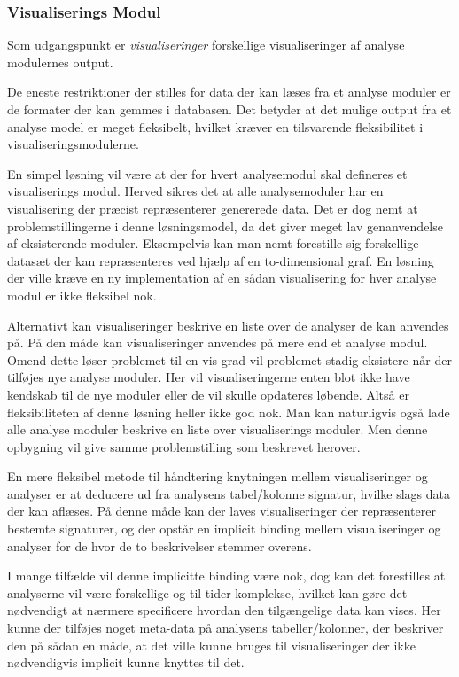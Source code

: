 \subsubsection{Visualiserings Modul}

Som udgangspunkt er \textit{visualiseringer} forskellige visualiseringer af analyse modulernes output.

De eneste restriktioner der stilles for data der kan læses fra et analyse moduler er de formater der kan gemmes i databasen.
Det betyder at det mulige output fra et analyse model er meget fleksibelt, hvilket kræver en tilsvarende fleksibilitet i visualiseringsmodulerne.

En simpel løsning vil være at der for hvert analysemodul skal defineres et visualiserings modul.
Herved sikres det at alle analysemoduler har en visualisering der præcist repræsenterer genererede data.
Det er dog nemt at problemstillingerne i denne løsningsmodel, da det giver meget lav genanvendelse af eksisterende moduler.
Eksempelvis kan man nemt forestille sig forskellige datasæt der kan repræsenteres ved hjælp af en to-dimensional graf.
En løsning der ville kræve en ny implementation af en sådan visualisering for hver analyse modul er ikke fleksibel nok.

Alternativt kan visualiseringer beskrive en liste over de analyser de kan anvendes på.
På den måde kan visualiseringer anvendes på mere end et analyse modul.
Omend dette løser problemet til en vis grad vil problemet stadig eksistere når der tilføjes nye analyse moduler.
Her vil visualiseringerne enten blot ikke have kendskab til de nye moduler eller de vil skulle opdateres løbende.
Altså er fleksibiliteten af denne løsning heller ikke god nok.
Man kan naturligvis også lade alle analyse moduler beskrive en liste over visualiserings moduler.
Men denne opbygning vil give samme problemstilling som beskrevet herover.

En mere fleksibel metode til håndtering knytningen mellem visualiseringer og analyser er at deducere ud fra analysens tabel/kolonne signatur, hvilke slags data der kan aflæses.
På denne måde kan der laves visualiseringer der repræsenterer bestemte signaturer, og der opstår en implicit binding mellem visualiseringer og analyser for de hvor de to beskrivelser stemmer overens.

I mange tilfælde vil denne implicitte binding være nok, dog kan det forestilles at analyserne vil være forskellige og til tider komplekse, hvilket kan gøre det nødvendigt at nærmere specificere hvordan den tilgængelige data kan vises.
Her kunne der tilføjes noget meta-data på analysens tabeller/kolonner, der beskriver den på sådan en måde, at det ville kunne bruges til visualiseringer der ikke nødvendigvis implicit kunne knyttes til det.

